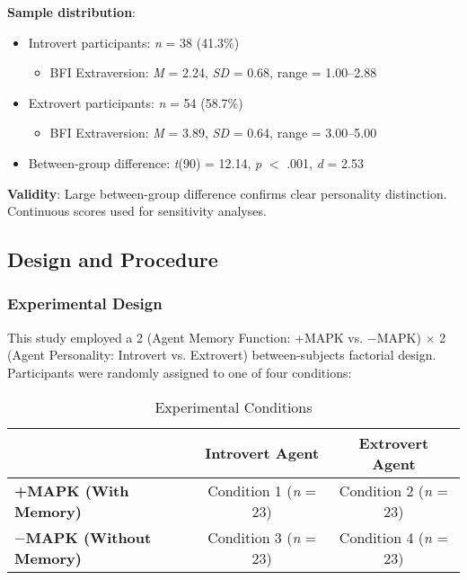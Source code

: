 \documentclass[12pt]{article}
\begin{document}
\textbf{Sample distribution}:
\begin{itemize}
    \item Introvert participants: \textit{n} = 38 (41.3\%)
    \begin{itemize}
        \item BFI Extraversion: \textit{M} = 2.24, \textit{SD} = 0.68, range = 1.00--2.88
    \end{itemize}
    \item Extrovert participants: \textit{n} = 54 (58.7\%)
    \begin{itemize}
        \item BFI Extraversion: \textit{M} = 3.89, \textit{SD} = 0.64, range = 3.00--5.00
    \end{itemize}
    \item Between-group difference: \textit{t}(90) = 12.14, \textit{p} $<$ .001, \textit{d} = 2.53
\end{itemize}

\textbf{Validity}: Large between-group difference confirms clear personality distinction. Continuous scores used for sensitivity analyses.

\subsection{Design and Procedure}

\subsubsection{Experimental Design}

This study employed a 2 (Agent Memory Function: +MAPK vs. $-$MAPK) $\times$ 2 (Agent Personality: Introvert vs. Extrovert) between-subjects factorial design. Participants were randomly assigned to one of four conditions:

\begin{table}[h]
\centering
\caption{Experimental Conditions}
\begin{tabular}{lcc}
\toprule
& \textbf{Introvert Agent} & \textbf{Extrovert Agent} \\
\midrule
\textbf{+MAPK (With Memory)} & Condition 1 (\textit{n} = 23) & Condition 2 (\textit{n} = 23) \\
\textbf{$-$MAPK (Without Memory)} & Condition 3 (\textit{n} = 23) & Condition 4 (\textit{n} = 23) \\
\bottomrule
\end{tabular}
\end{table}
\end{document}
